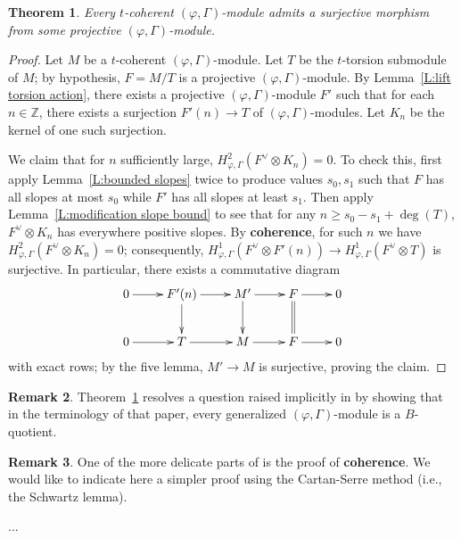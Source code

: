 \documentclass[12pt]{amsart}
\newtheorem{theorem}{Theorem}[section]
\theoremstyle{definition}
\newtheorem{remark}[theorem]{Remark}
\numberwithin{equation}{theorem}
\newcommand{\ZZ}{\mathbb{Z}}
\newcommand{\dual}{\vee}
\begin{document}
\begin{theorem} \label{T:t-coherent lift}
Every $t$-coherent $(\varphi, \Gamma)$-module admits a surjective morphism from some projective $(\varphi, \Gamma)$-module.
\end{theorem}
\begin{proof}
Let $M$ be a $t$-coherent $(\varphi, \Gamma)$-module. Let $T$ be the $t$-torsion submodule of $M$; by hypothesis, $F = M/T$ is a projective $(\varphi, \Gamma)$-module.
By Lemma~\ref{L:lift torsion action}, there exists a projective $(\varphi, \Gamma)$-module $F'$ such that  for each $n \in \ZZ$, there exists a surjection $F'(n) \to T$ of $(\varphi, \Gamma)$-modules. Let $K_n$ be the kernel of one such surjection. 

We claim that for $n$ sufficiently large, $H^2_{\varphi, \Gamma}(F^\dual \otimes K_n) = 0$.
To check this, first apply Lemma~\ref{L:bounded slopes} twice to produce values $s_0, s_1$ such that $F$ has all slopes at most $s_0$ while $F'$ has all slopes at least $s_1$.
Then apply Lemma~\ref{L:modification slope bound} to see that for any
$n \geq s_0-s_1 + \deg(T)$,
$F^\dual \otimes K_n$ has everywhere positive slopes. 
By \textbf{coherence}, for such $n$ we have $H^2_{\varphi, \Gamma}(F^\dual \otimes K_n) = 0$; consequently, $H^1_{\varphi, \Gamma}(F^\dual \otimes F'(n)) \to H^1_{\varphi, \Gamma}(F^\dual \otimes T)$ is surjective. In particular, there exists a commutative diagram
\[
\xymatrix{
0 \ar[r] & F'(n) \ar[r] \ar[d] & M' \ar[r] \ar[d] & F \ar[r] \ar@{=}[d] & 0 \\
0 \ar[r] & T \ar[r] & M \ar[r] & F \ar[r] & 0
}
\]
with exact rows; by the five lemma, $M' \to M$ is surjective, proving the claim.
\end{proof}

\begin{remark}
Theorem~\ref{T:t-coherent lift} resolves a question raised implicitly in
\cite{kedlaya-bordeaux} by showing that in the terminology of that paper,
every generalized $(\varphi, \Gamma)$-module is a $B$-quotient.
\end{remark}

\begin{remark}
One of the more delicate parts of \cite{kpx} is the proof of \textbf{coherence}. 
We would like to indicate here a simpler proof using the Cartan-Serre method (i.e., the Schwartz lemma).

...
\end{remark}
\end{document}
